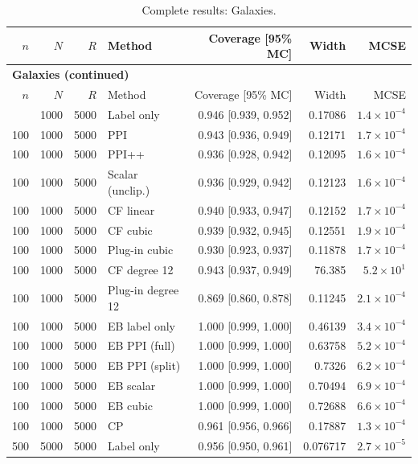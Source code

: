 {\setlength{\tabcolsep}{3pt}\begin{longtable}{rrrlrrr}
\caption{Complete results: Galaxies.}\\
\toprule $n$ & $N$ & $R$ & Method & Coverage [95\% MC] & Width & MCSE \\
\midrule\endfirsthead
\multicolumn{7}{l}{\textbf{Galaxies (continued)}}\\
\toprule $n$ & $N$ & $R$ & Method & Coverage [95\% MC] & Width & MCSE \\
\midrule\endhead
\bottomrule\endfoot
100 & 1000 & 5000 & Label only & 0.946 [0.939, 0.952] & 0.17086 & $1.4\times 10^{-4}$ \\
100 & 1000 & 5000 & PPI & 0.943 [0.936, 0.949] & 0.12171 & $1.7\times 10^{-4}$ \\
100 & 1000 & 5000 & PPI++ & 0.936 [0.928, 0.942] & 0.12095 & $1.6\times 10^{-4}$ \\
100 & 1000 & 5000 & Scalar (unclip.) & 0.936 [0.929, 0.942] & 0.12123 & $1.6\times 10^{-4}$ \\
100 & 1000 & 5000 & CF linear & 0.940 [0.933, 0.947] & 0.12152 & $1.7\times 10^{-4}$ \\
100 & 1000 & 5000 & CF cubic & 0.939 [0.932, 0.945] & 0.12551 & $1.9\times 10^{-4}$ \\
100 & 1000 & 5000 & Plug-in cubic & 0.930 [0.923, 0.937] & 0.11878 & $1.7\times 10^{-4}$ \\
100 & 1000 & 5000 & CF degree 12 & 0.943 [0.937, 0.949] & 76.385 & $5.2\times 10^{1}$ \\
100 & 1000 & 5000 & Plug-in degree 12 & 0.869 [0.860, 0.878] & 0.11245 & $2.1\times 10^{-4}$ \\
100 & 1000 & 5000 & EB label only & 1.000 [0.999, 1.000] & 0.46139 & $3.4\times 10^{-4}$ \\
100 & 1000 & 5000 & EB PPI (full) & 1.000 [0.999, 1.000] & 0.63758 & $5.2\times 10^{-4}$ \\
100 & 1000 & 5000 & EB PPI (split) & 1.000 [0.999, 1.000] & 0.7326 & $6.2\times 10^{-4}$ \\
100 & 1000 & 5000 & EB scalar & 1.000 [0.999, 1.000] & 0.70494 & $6.9\times 10^{-4}$ \\
100 & 1000 & 5000 & EB cubic & 1.000 [0.999, 1.000] & 0.72688 & $6.6\times 10^{-4}$ \\
100 & 1000 & 5000 & CP & 0.961 [0.956, 0.966] & 0.17887 & $1.3\times 10^{-4}$ \\
500 & 5000 & 5000 & Label only & 0.956 [0.950, 0.961] & 0.076717 & $2.7\times 10^{-5}$ \\

\end{longtable}}
